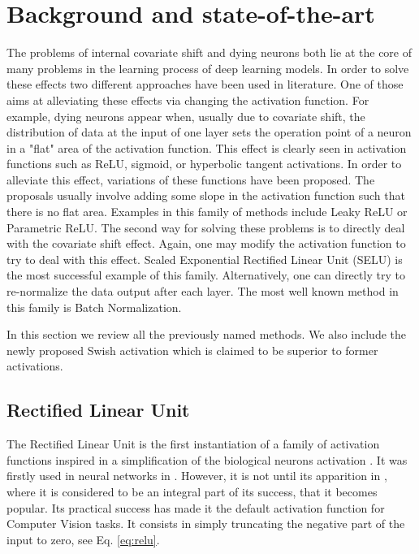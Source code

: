 \documentclass[10pt,twocolumn,letterpaper]{article}
\begin{document}
\section{Background and state-of-the-art}\label{sec:review}

The problems of internal covariate shift and dying neurons both lie at the core of many problems in the learning process of deep learning models. In order to solve these effects two different approaches have been used in literature. One of those aims at alleviating these effects via changing the activation function. For example, dying neurons appear when, usually due to covariate shift, the distribution of data at the input of one layer sets the operation point of a neuron in a "flat" area of the activation function. This effect is clearly seen in activation functions such as ReLU, sigmoid, or hyperbolic tangent activations. In order to alleviate this effect, variations of these functions have been proposed. The proposals usually involve adding some slope in the activation function such that there is no flat area. Examples in this family of methods include Leaky ReLU\cite{leakyrelu} or Parametric ReLU\cite{prelu}. The second way for solving these problems is to directly deal with the covariate shift effect. Again, one may modify the activation function to try to deal with this effect. Scaled Exponential Rectified Linear Unit\cite{selu} (SELU) is the most successful example of this family. Alternatively, one can directly try to re-normalize the data output after each layer. The most well known method in this family is Batch Normalization\cite{batchnorm}. 

In this section we review all the previously named methods. We also include the newly proposed Swish activation \cite{swish} which is claimed to be superior to former activations.

\subsection{Rectified Linear Unit}

The Rectified Linear Unit is the first instantiation of a family of activation functions inspired in a simplification of the biological neurons activation \cite{relu_neurology}. It was firstly used in neural networks in \cite{firstrelu}. However, it is not until its apparition in \cite{alexnet}, where it is considered to be an integral part of its success, that it becomes popular. Its practical success has made it the default activation function for Computer Vision tasks. It consists in simply truncating the negative part of the input to zero, see Eq. \ref{eq:relu}.
\end{document}

